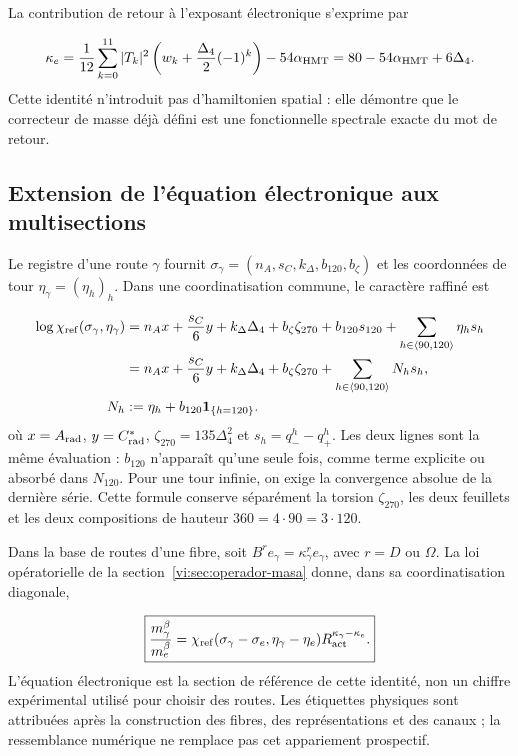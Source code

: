 La contribution de retour à l’exposant électronique s’exprime par

\begin{equation}
 \kappa_e=
 \frac1{12}\sum_{k=0}^{11}|T_k|^2
 \left(w_k+\frac{\Delta_4}{2}(-1)^k\right)-54\alpha_{\rm HMT}
 =80-54\alpha_{\rm HMT}+6\Delta_4.
 \label{vi:eq:kappa-espectral-electron}
\end{equation}
Cette identité n’introduit pas d’hamiltonien spatial : elle démontre que le
correcteur de masse déjà défini est une fonctionnelle spectrale exacte du mot
de retour.


\subsection{Extension de l’équation électronique aux multisections
}

Le registre d’une route $\gamma$ fournit
$\sigma_\gamma=(n_A,s_C,k_\Delta,b_{120},b_\zeta)$ et les coordonnées de
tour $\eta_\gamma=(\eta_h)_h$. Dans une coordinatisation commune, le caractère raffiné est

\begin{equation}
 \begin{aligned}
 \log\chi_{\rm ref}(\sigma_\gamma,\eta_\gamma)
 &=n_Ax+\frac{s_C}{6}y+k_\Delta\Delta_4+b_\zeta\zeta_{270}
   +b_{120}s_{120}+\sum_{h\in\langle90,120\rangle}\eta_hs_h\\
 &=n_Ax+\frac{s_C}{6}y+k_\Delta\Delta_4+b_\zeta\zeta_{270}
   +\sum_{h\in\langle90,120\rangle}N_hs_h,\\
 N_h&:=\eta_h+b_{120}\mathbf1_{\{h=120\}}.
 \end{aligned}
 \label{vi:eq:caracter-refinado-explicito}
\end{equation}
où $x=A_{\rm rad}$, $y=C^*_{\rm rad}$,
$\zeta_{270}=135\Delta_4^2$ et $s_h=q_-^h-q_+^h$. Les deux lignes sont la
même évaluation : $b_{120}$ n’apparaît qu’une seule fois, comme terme explicite ou
absorbé dans $N_{120}$. Pour une tour infinie, on exige la convergence absolue
de la dernière série. Cette formule conserve séparément la torsion $\zeta_{270}$,
les deux feuillets et les deux compositions de hauteur $360=4\cdot90=3\cdot120$.


Dans la base de routes d’une fibre, soit
$B^r e_\gamma=\kappa_\gamma^r e_\gamma$, avec $r=D$ ou $\Omega$. La loi
opératorielle de la section~\ref{vi:sec:operador-masa} donne, dans sa coordinatisation diagonale,

\begin{equation}
 \boxed{
 \frac{m_\gamma^\beta}{m_e^\beta}=
 \chi_{\rm ref}(\sigma_\gamma-\sigma_e,
                 \eta_\gamma-\eta_e)
 R_{\rm act}^{\kappa_\gamma-\kappa_e}.}
 \label{vi:eq:ley-masas-trayectoria}
\end{equation}
L’équation électronique est la section de référence de cette identité, non
un chiffre expérimental utilisé pour choisir des routes. Les étiquettes physiques sont
attribuées après la construction des fibres, des représentations et des canaux ; la ressemblance
numérique ne remplace pas cet appariement prospectif.


